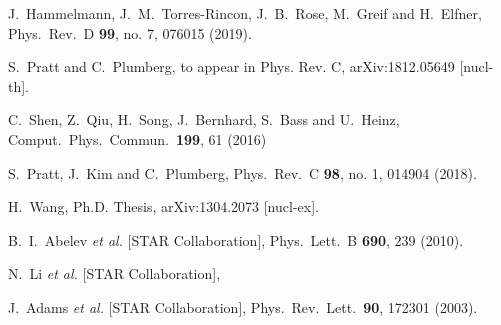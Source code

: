 \begin{thebibliography}{99}
  J.~Hammelmann, J.~M.~Torres-Rincon, J.~B.~Rose, M.~Greif and H.~Elfner,
  Phys.\ Rev.\ D {\bf 99}, no. 7, 076015 (2019).

  S.~Pratt and C.~Plumberg,
  to appear in Phys. Rev. C, arXiv:1812.05649 [nucl-th].

  C.~Shen, Z.~Qiu, H.~Song, J.~Bernhard, S.~Bass and U.~Heinz,
  Comput.\ Phys.\ Commun.\  {\bf 199}, 61 (2016)

  S.~Pratt, J.~Kim and C.~Plumberg,
  Phys.\ Rev.\ C {\bf 98}, no. 1, 014904 (2018).

  H.~Wang, Ph.D. Thesis,
  arXiv:1304.2073 [nucl-ex].

  B.~I.~Abelev {\it et al.} [STAR Collaboration],
  Phys.\ Lett.\ B {\bf 690}, 239 (2010).

  N.~Li {\it et al.} [STAR Collaboration],

  J.~Adams {\it et al.} [STAR Collaboration],
  Phys.\ Rev.\ Lett.\  {\bf 90}, 172301 (2003).
   

\end{thebibliography}
